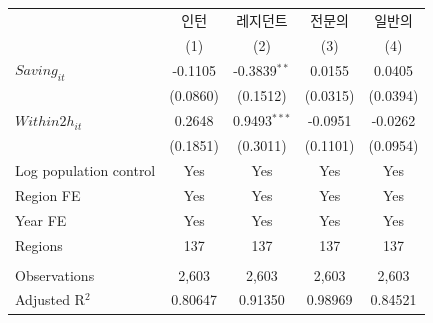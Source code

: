 \begingroup
\centering
\begin{tabular}{lcccc}
   \toprule
                          & 인턴     & 레지던트       & 전문의   & 일반의 \\   
                          & (1)      & (2)            & (3)      & (4)\\  
   \midrule 
   $Saving_{it}$          & -0.1105  & -0.3839$^{**}$ & 0.0155   & 0.0405\\   
                          & (0.0860) & (0.1512)       & (0.0315) & (0.0394)\\   
   $Within2h_{it}$        & 0.2648   & 0.9493$^{***}$ & -0.0951  & -0.0262\\   
                          & (0.1851) & (0.3011)       & (0.1101) & (0.0954)\\   
   Log population control & Yes      & Yes            & Yes      & Yes\\  
   Region FE              & Yes      & Yes            & Yes      & Yes\\  
   Year FE                & Yes      & Yes            & Yes      & Yes\\  
   Regions                & 137      & 137            & 137      & 137\\  
    \\
   Observations           & 2,603    & 2,603          & 2,603    & 2,603\\  
   Adjusted R$^2$         & 0.80647  & 0.91350        & 0.98969  & 0.84521\\  
   \bottomrule
\end{tabular}
\par\endgroup
